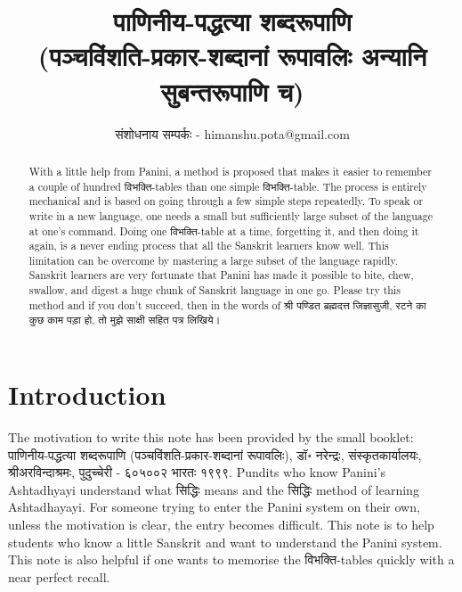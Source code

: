 \documentclass[leqno,fleqn,12pt]{article}%
\title{पाणिनीय-पद्धत्या शब्दरूपाणि \\ (पञ्चविंशति-प्रकार-शब्दानां रूपावलिः अन्यानि सुबन्तरूपाणि च)}
\author{संशोधनाय सम्पर्कः - himanshu.pota@gmail.com}
\begin{document}
%
%
%
%
%
%
%
%

%
\maketitle

\begin{abstract}
With a little help from Panini, a method is proposed that makes it easier to remember a couple of hundred विभक्ति-tables than one simple विभक्ति-table. The process is entirely mechanical and is based on going through a few simple steps repeatedly. To speak or write in a new language, one needs a small but sufficiently large subset of the language at one's command. Doing one विभक्ति-table at a time, forgetting it, and then doing it again, is a never ending process that all the Sanskrit learners know well. This limitation can be overcome by mastering a large subset of the language rapidly. Sanskrit learners are very fortunate that Panini has made it possible to bite, chew, swallow, and digest a huge chunk of Sanskrit language in one go. Please try this method and if you don't succeed, then in the words of श्री पण्डित ब्रह्मदत्त जिज्ञासुजी, रटने का कुछ काम पड़ा हो, तो मुझे साक्षी सहित पत्र लिखिये।
\end{abstract}

\section{Introduction}
The motivation to write this note has been provided by the small booklet:
पाणिनीय-पद्धत्या शब्दरूपाणि (पञ्चविंशति-प्रकार-शब्दानां रूपावलिः), डॉ॰ नरेन्द्रः, संस्कृतकार्यालयः, श्रीअरविन्दाश्रमः, पुदुच्चेरी - ६०५००२ भारतः १९९९. Pundits who know Panini's Ashtadhyayi understand what सिद्धिः means and the सिद्धिः method of learning Ashtadhayayi. For someone trying to enter the Panini system on their own, unless the motivation is clear, the entry becomes difficult. This note is to help students who know a little Sanskrit and want to understand the Panini system. This note is also helpful if one wants to memorise the विभक्ति-tables quickly with a near perfect recall.
\end{document}
